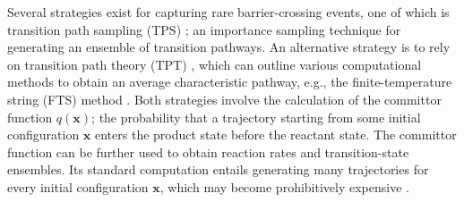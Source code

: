 \documentclass{article}
\numberwithin{equation}{section}
\def\*#1{\mathbf{#1}}
\theoremstyle{definition}
\theoremstyle{remark}
\begin{document}
Several strategies exist for capturing rare barrier-crossing events, one of which is transition path sampling (TPS) \cite{dellago1998transition,bolhuis2002transition}; an importance sampling technique for generating an ensemble of transition pathways. An alternative strategy is to rely on transition path theory (TPT) \cite{weinan2006towards,vanden2010transition}, which can outline
various computational methods to obtain an average characteristic pathway, e.g., the finite-temperature
string (FTS) method \cite{weinan2005finite,vanden2009revisiting}.
Both strategies involve the calculation of the committor function $q(\* x)$; the probability that a trajectory starting from some initial configuration $\* x$ enters the product state before the reactant state. 
The committor function can be further used to obtain reaction rates and transition-state ensembles. 
Its standard computation entails generating many trajectories for every initial configuration 
$\* x$, which may become prohibitively expensive \cite{peters2006}. 
\end{document}

